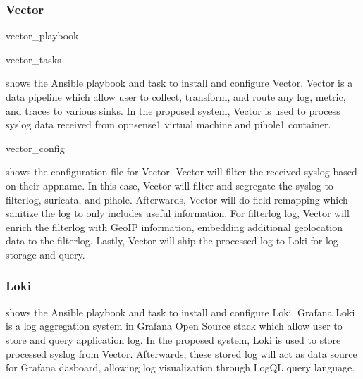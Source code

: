 \documentclass[../index.tex]{subfiles}
\begin{document}
\subsubsection{Vector}

{vector_playbook}

{vector_tasks}

 shows the Ansible playbook and task to install and
configure Vector. Vector is a data pipeline which allow user to collect, transform, and route any
log, metric, and traces to various sinks. In the proposed system, Vector is used to process syslog
data received from opnsense1 virtual machine and pihole1 container.

{vector_config}

 shows the configuration file for Vector. Vector will filter the
received syslog based on their appname. In this case, Vector will filter and segregate the syslog to
filterlog, suricata, and pihole. Afterwards, Vector will do field remapping which sanitize the log
to only includes useful information. For filterlog log, Vector will enrich the filterlog with GeoIP
information, embedding additional geolocation data to the filterlog. Lastly, Vector will ship the
processed log to Loki for log storage and query.

\subsubsection{Loki}



 shows the Ansible playbook and task to install and configure
Loki. Grafana Loki is a log aggregation system in Grafana Open Source stack which allow user to
store and query application log. In the proposed system, Loki is used to store processed syslog from
Vector. Afterwards, these stored log will act as data source for Grafana dasboard, allowing log
visualization through LogQL query language.
\end{document}
